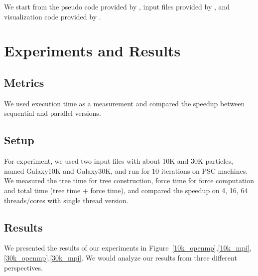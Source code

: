 \documentclass{article}
\begin{document}
We start from the pseudo code provided by \cite{pseudo_code}, input files provided by \cite{input}, and visualization code provided by \cite{visualization}.




\section{Experiments and Results}

\subsection{Metrics}
We used execution time as a measurement and compared the speedup between sequential and parallel versions.

\subsection{Setup}
For experiment, we used two input files with about 10K and 30K particles, named Galaxy10K and Galaxy30K, and run for 10 iterations on PSC machines. We measured the tree time for tree construction, force time for force computation and total time (tree time + force time), and compared the speedup on 4, 16, 64 threads/cores with single thread version.

\subsection{Results}
We presented the results of our experiments in Figure~\ref{10k_openmp},\ref{10k_mpi},\ref{30k_openmp},\ref{30k_mpi}. We would analyze our results from three different perspectives. 
\end{document}
